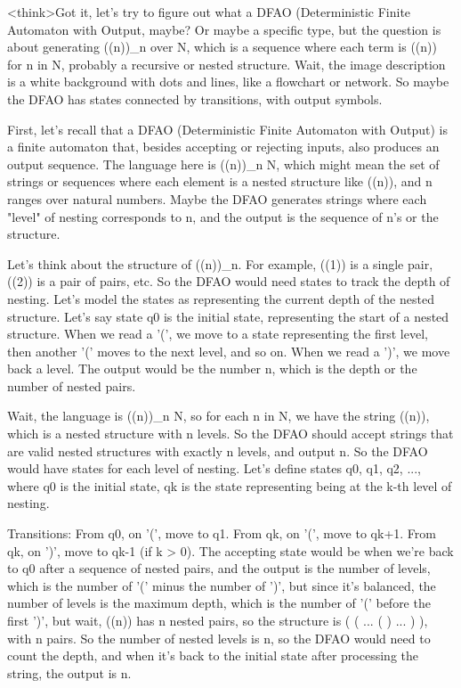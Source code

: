 <think>Got it, let's try to figure out what a DFAO (Deterministic Finite Automaton with Output, maybe? Or maybe a specific type, but the question is about generating ((n))_n over N, which is a sequence where each term is ((n)) for n in N, probably a recursive or nested structure. Wait, the image description is a white background with dots and lines, like a flowchart or network. So maybe the DFAO has states connected by transitions, with output symbols.

First, let's recall that a DFAO (Deterministic Finite Automaton with Output) is a finite automaton that, besides accepting or rejecting inputs, also produces an output sequence. The language here is ((n))_n N, which might mean the set of strings or sequences where each element is a nested structure like ((n)), and n ranges over natural numbers. Maybe the DFAO generates strings where each "level" of nesting corresponds to n, and the output is the sequence of n's or the structure.

Let's think about the structure of ((n))_n. For example, ((1)) is a single pair, ((2)) is a pair of pairs, etc. So the DFAO would need states to track the depth of nesting. Let's model the states as representing the current depth of the nested structure. Let's say state q0 is the initial state, representing the start of a nested structure. When we read a '(', we move to a state representing the first level, then another '(' moves to the next level, and so on. When we read a ')', we move back a level. The output would be the number n, which is the depth or the number of nested pairs.

Wait, the language is ((n))_n N, so for each n in N, we have the string ((n)), which is a nested structure with n levels. So the DFAO should accept strings that are valid nested structures with exactly n levels, and output n. So the DFAO would have states for each level of nesting. Let's define states q0, q1, q2, ..., where q0 is the initial state, qk is the state representing being at the k-th level of nesting.

Transitions: From q0, on '(', move to q1. From qk, on '(', move to qk+1. From qk, on ')', move to qk-1 (if k > 0). The accepting state would be when we're back to q0 after a sequence of nested pairs, and the output is the number of levels, which is the number of '(' minus the number of ')', but since it's balanced, the number of levels is the maximum depth, which is the number of '(' before the first ')', but wait, ((n)) has n nested pairs, so the structure is ( ( ... ( ) ... ) ), with n pairs. So the number of nested levels is n, so the DFAO would need to count the depth, and when it's back to the initial state after processing the string, the output is n.

